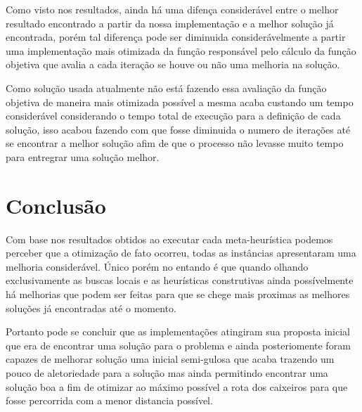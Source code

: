 \documentclass[12pt]{article}
\begin{document}
Como visto nos resultados, ainda há uma difença considerável entre o melhor resultado encontrado a partir da nossa implementação e a melhor solução já encontrada, porém tal diferença pode ser diminuida considerávelmente a partir uma implementação mais otimizada da função responsável pelo cálculo da função objetiva que avalia a cada iteração se houve ou não uma melhoria na solução.

Como solução usada atualmente não está fazendo essa avaliação da função objetiva de maneira mais otimizada possível a mesma acaba custando um tempo considerável considerando o tempo total de execução para a definição de cada solução, isso acabou fazendo com que fosse diminuida o numero de iterações até se encontrar a melhor solução afim de que o processo não levasse muito tempo para entregrar uma solução melhor.

\section{Conclusão}

Com base nos resultados obtidos ao executar cada meta-heurística podemos perceber que a otimização de fato ocorreu, todas as instâncias apresentaram uma melhoria considerável. Único porém no entando é que quando olhando exclusivamente as buscas locais e as heurísticas construtivas ainda possívelmente há melhorias que podem ser feitas para que se chege mais proximas as melhores soluções já encontradas até o momento.

Portanto pode se concluir que as implementações atingiram sua proposta inicial que era de encontrar uma solução para o problema e ainda posteriomente foram capazes de melhorar solução uma inicial semi-gulosa que acaba trazendo um pouco de aletoriedade para a solução mas ainda permitindo encontrar uma solução boa a fim de otimizar ao máximo possível a rota dos caixeiros para que fosse percorrida com a menor distancia possível.



\end{document}
